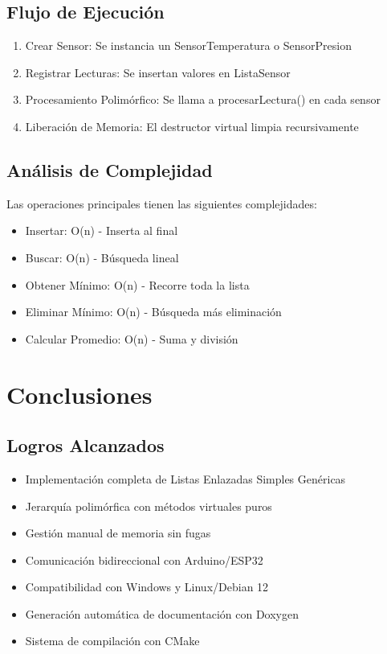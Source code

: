 \documentclass[12pt, spanish]{article}
\begin{document}
\subsection{Flujo de Ejecución}

\begin{enumerate}
    \item Crear Sensor: Se instancia un SensorTemperatura o SensorPresion
    \item Registrar Lecturas: Se insertan valores en ListaSensor
    \item Procesamiento Polimórfico: Se llama a procesarLectura() en cada sensor
    \item Liberación de Memoria: El destructor virtual limpia recursivamente
\end{enumerate}

\subsection{Análisis de Complejidad}

Las operaciones principales tienen las siguientes complejidades:

\begin{itemize}
    \item Insertar: O(n) - Inserta al final
    \item Buscar: O(n) - Búsqueda lineal
    \item Obtener Mínimo: O(n) - Recorre toda la lista
    \item Eliminar Mínimo: O(n) - Búsqueda más eliminación
    \item Calcular Promedio: O(n) - Suma y división
\end{itemize}

\section{Conclusiones}

\subsection{Logros Alcanzados}

\begin{itemize}
    \item Implementación completa de Listas Enlazadas Simples Genéricas
    \item Jerarquía polimórfica con métodos virtuales puros
    \item Gestión manual de memoria sin fugas
    \item Comunicación bidireccional con Arduino/ESP32
    \item Compatibilidad con Windows y Linux/Debian 12
    \item Generación automática de documentación con Doxygen
    \item Sistema de compilación con CMake
\end{itemize}
\end{document}
